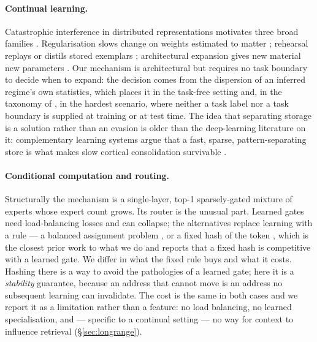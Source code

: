 \documentclass[11pt,a4paper]{article}
\begin{document}
\paragraph{Continual learning.}
Catastrophic interference in distributed representations
\citep{mccloskey1989catastrophic,ratcliff1990connectionist,french1999catastrophic}
motivates three broad families \citep{parisi2019continual,delange2021continual}.
Regularisation slows change on weights estimated to matter
\citep{kirkpatrick2017overcoming,zenke2017continual,li2017learning}; rehearsal
replays or distils stored exemplars
\citep{rebuffi2017icarl,lopezpaz2017gradient,chaudhry2019tiny}; architectural
expansion gives new material new parameters
\citep{rusu2016progressive,yoon2018lifelong}. Our mechanism is architectural
but requires no task boundary to decide when to expand: the decision comes from
the dispersion of an inferred regime's own statistics, which places it in the
task-free setting \citep{aljundi2019task} and, in the taxonomy of
\citet{vandeven2019three}, in the hardest scenario, where neither a task label
nor a task boundary is supplied at training or at test time. The idea that
separating storage is a solution rather than an evasion is older than the
deep-learning literature on it: complementary learning systems argue that a
fast, sparse, pattern-separating store is what makes slow cortical
consolidation survivable \citep{mcclelland1995why,kumaran2016what}.

\paragraph{Conditional computation and routing.}
Structurally the mechanism is a single-layer, top-1 sparsely-gated mixture of
experts \citep{jacobs1991adaptive,bengio2013estimating,shazeer2017outrageously,fedus2022switch}
whose expert count grows. Its router is the unusual part. Learned gates need
load-balancing losses and can collapse; the alternatives replace learning with
a rule --- a balanced assignment problem \citep{lewis2021base}, or a fixed
hash of the token \citep{roller2021hash}, which is the closest prior work to
what we do and reports that a fixed hash is competitive with a learned gate.
We differ in what the fixed rule buys and what it costs. Hashing there is a
way to avoid the pathologies of a learned gate; here it is a
\emph{stability} guarantee, because an address that cannot move is an address
no subsequent learning can invalidate. The cost is the same in both cases and
we report it as a limitation rather than a feature: no load balancing, no
learned specialisation, and --- specific to a continual setting --- no way for
context to influence retrieval (\S\ref{sec:longrange}).
\end{document}
